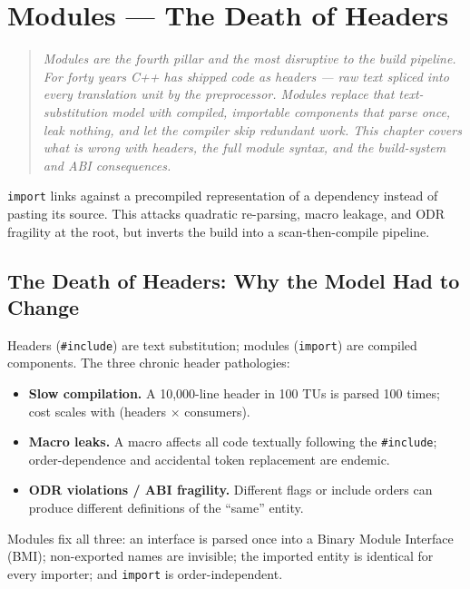 \chapter{Modules --- The Death of Headers}
\label{ch:c20-modules}

\begin{quote}
\emph{Modules are the fourth pillar and the most disruptive to the build pipeline. For forty years C++ has shipped code as headers --- raw text spliced into every translation unit by the preprocessor. Modules replace that text-substitution model with compiled, importable components that parse once, leak nothing, and let the compiler skip redundant work. This chapter covers what is wrong with headers, the full module syntax, and the build-system and ABI consequences.}
\end{quote}

\texttt{import} links against a precompiled representation of a dependency instead of pasting its source. This attacks quadratic re-parsing, macro leakage, and ODR fragility at the root, but inverts the build into a scan-then-compile pipeline.

\section{The Death of Headers: Why the Model Had to Change}
\label{sec:c20-death-of-headers}

Headers (\texttt{\#include}) are text substitution; modules (\texttt{import}) are compiled components. The three chronic header pathologies:

\begin{itemize}
\item \textbf{Slow compilation.} A 10,000-line header in 100 TUs is parsed 100 times; cost scales with (headers $\times$ consumers).
\item \textbf{Macro leaks.} A macro affects all code textually following the \texttt{\#include}; order-dependence and accidental token replacement are endemic.
\item \textbf{ODR violations / ABI fragility.} Different flags or include orders can produce different definitions of the ``same'' entity.
\end{itemize}

Modules fix all three: an interface is parsed once into a Binary Module Interface (BMI); non-exported names are invisible; the imported entity is identical for every importer; and \texttt{import} is order-independent.

